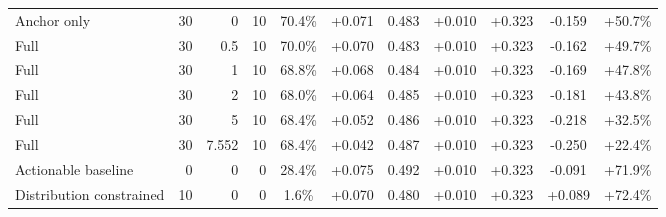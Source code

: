 \begin{table}[htbp]
\begin{tabular}{lrrrccccccc}
Anchor only & 30 & 0 & 10 & 70.4\% & +0.071 & 0.483 & +0.010 & +0.323 & -0.159 & +50.7\% \\
Full & 30 & 0.5 & 10 & 70.0\% & +0.070 & 0.483 & +0.010 & +0.323 & -0.162 & +49.7\% \\
Full & 30 & 1 & 10 & 68.8\% & +0.068 & 0.484 & +0.010 & +0.323 & -0.169 & +47.8\% \\
Full & 30 & 2 & 10 & 68.0\% & +0.064 & 0.485 & +0.010 & +0.323 & -0.181 & +43.8\% \\
Full & 30 & 5 & 10 & 68.4\% & +0.052 & 0.486 & +0.010 & +0.323 & -0.218 & +32.5\% \\
Full & 30 & 7.552 & 10 & 68.4\% & +0.042 & 0.487 & +0.010 & +0.323 & -0.250 & +22.4\% \\
Actionable baseline & 0 & 0 & 0 & 28.4\% & +0.075 & 0.492 & +0.010 & +0.323 & -0.091 & +71.9\% \\
Distribution constrained & 10 & 0 & 0 & 1.6\% & +0.070 & 0.480 & +0.010 & +0.323 & +0.089 & +72.4\% \\
\bottomrule
\end{tabular}
\end{table}